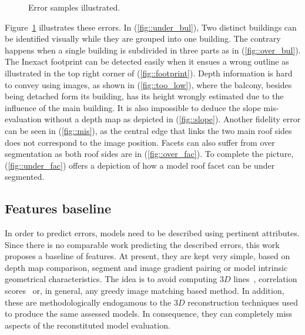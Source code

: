 \documentclass[runningheads]{llncs}
\newcounter{SubFigCounter}
\begin{document}
\begin{figure}[H]
\begin{center}
{{                    \label{fig::fac_err}
                    \addtocounter{figure}{-1}
                }
            }
            {
                \caption{\label{fig::samples}Error samples illustrated.}
            }
        \end{center}
    \end{figure}

    Figure~\ref{fig::samples} illustrates these errors. In (\ref{fig::under_bul}), Two distinct buildings can be identified visually while they are grouped into one building. The contrary happens when a single building is subdivided in three parts as in (\ref{fig::over_bul}). The Inexact footprint can be detected easily when it ensues a wrong outline as illustrated in the top right corner of (\ref{fig::footprint}). Depth information is hard to convey using images, as shown in (\ref{fig::too_low}), where the balcony, besides being detached form its building, has its height wrongly estimated due to the influence of the main building. It is also impossible to deduce the slope mis-evaluation without a depth map as depicted in (\ref{fig::slope}). Another fidelity error can be seen in (\ref{fig::mis}), as the central edge that links the two main roof sides does not correspond to the image position. Facets can also suffer from over segmentation as both roof sides are in (\ref{fig::over_fac}). To complete the picture, (\ref{fig::under_fac}) offers a depiction of how a model roof facet can be under segmented.

\subsection{Features baseline}
In order to predict errors, models need to be described using pertinent attributes. Since there is no comparable work predicting the described errors, this work proposes a baseline of features. At present, they are kept very simple, based on depth map comparison, segment and image gradient pairing or model intrinsic geometrical characteristics. The idea is to avoid computing $3D$ lines~\cite{Michelin2013}, correlation scores~\cite{boudet2006supervised} or, in general, any greedy image matching based method. In addition, these are methodologically endogamous to the $3D$ reconstruction techniques used to produce the same assessed models. In consequence, they can completely miss aspects of the reconstituted model evaluation.
\end{document}
